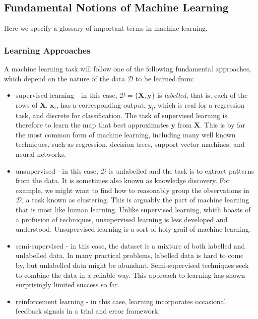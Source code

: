 \documentclass[11pt]{amsart}
\begin{document}
\subsection{Fundamental Notions of Machine Learning}

Here we specify a glossary of important terms in machine learning.

\subsubsection{Learning Approaches}

A machine learning task will follow one of the following fundamental approaches, which depend on the nature of the data $\mathcal{D}$ to be learned from:

\begin{itemize}
\item supervised learning - in this case, $\mathcal{D} = \{\mathbf{X}, \mathbf{y}\}$ is \emph{labelled}, that is, each of the rows of $\mathbf{X}$, $\mathbf{x}_i$, has a corresponding output, $y_i$, which is real for a regression task, and discrete for classification. The task of supervised learning is therefore to learn the map that best approximates $\mathbf{y}$ from $\mathbf{X}$. This is by far the most common form of machine learning, including many well known techniques, such as regression, decision trees, support vector machines, and neural networks.
\item unsupervised - in this case, $\mathcal{D}$ is unlabelled and the task is to extract patterns from the data. It is sometimes also known as knowledge discovery. For example, we might want to find how to reasonably group the observations in $\mathcal{D}$, a task known as clustering. This is arguably the part of machine learning that is most like human learning. Unlike supervised learning, which boasts of a profusion of techniques, unsupervised learning is less developed and understood. Unsupervised learning is a sort of holy grail of machine learning.
\item semi-supervised - in this case, the dataset is a mixture of both labelled and unlabelled data. In many practical problems, labelled data is hard to come by, but unlabelled data might be abundant. Semi-supervised techniques seek to combine the data in a reliable way. This approach to learning has shown surprisingly limited success so far.
\item reinforcement learning - in this case, learning incorporates occasional feedback signals in a trial and error framework.
\end{itemize}
\end{document}
